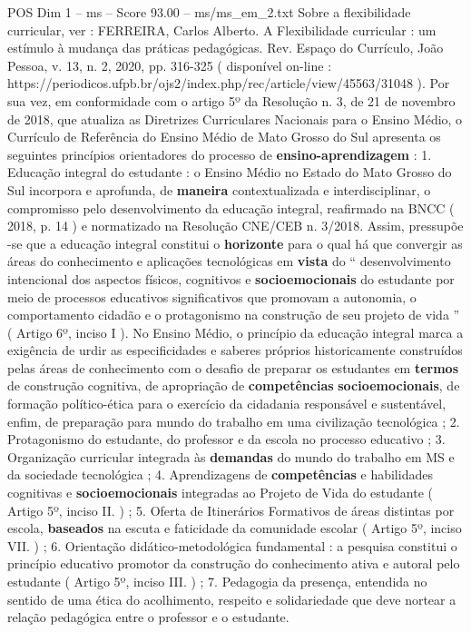 \begin{textsample}{POS Dim 1 – ms – Score 93.00 – ms/ms\_em\_2.txt}
Sobre a flexibilidade curricular, ver : FERREIRA, Carlos Alberto.
A Flexibilidade curricular : um estímulo à mudança das práticas pedagógicas.
Rev.
Espaço do Currículo, João Pessoa, v. 13, n. 2, 2020, pp. 316-325 ( disponível on-line : https://periodicos.ufpb.br/ojs2/index.php/rec/article/view/45563/31048 ).
Por sua vez, em conformidade com o artigo 5º da Resolução n. 3, de 21 de novembro de 2018, que atualiza as Diretrizes Curriculares Nacionais para o Ensino Médio, o Currículo de Referência do Ensino Médio de Mato Grosso do Sul apresenta os seguintes princípios orientadores do processo de \textbf{ensino-aprendizagem} : 1.
Educação integral do estudante : o Ensino Médio no Estado do Mato Grosso do Sul incorpora e aprofunda, de \textbf{maneira} contextualizada e interdisciplinar, o compromisso pelo desenvolvimento da educação integral, reafirmado na BNCC ( 2018, p. 14 ) e normatizado na Resolução CNE/CEB n. 3/2018.
Assim, pressupõe -se que a educação integral constitui o \textbf{horizonte} para o qual há que convergir as áreas do conhecimento e aplicações tecnológicas em \textbf{vista} do “ desenvolvimento intencional dos aspectos físicos, cognitivos e \textbf{socioemocionais} do estudante por meio de processos educativos significativos que promovam a autonomia, o comportamento cidadão e o protagonismo na construção de seu projeto de vida ” ( Artigo 6º, inciso I ).
No Ensino Médio, o princípio da educação integral marca a exigência de urdir as especificidades e saberes próprios historicamente construídos pelas áreas de conhecimento com o desafio de preparar os estudantes em \textbf{termos} de construção cognitiva, de apropriação de \textbf{competências} \textbf{socioemocionais}, de formação político-ética para o exercício da cidadania responsável e sustentável, enfim, de preparação para mundo do trabalho em uma civilização tecnológica ; 2.
Protagonismo do estudante, do professor e da escola no processo educativo ; 3.
Organização curricular integrada às \textbf{demandas} do mundo do trabalho em MS e da sociedade tecnológica ; 4.
Aprendizagens de \textbf{competências} e habilidades cognitivas e \textbf{socioemocionais} integradas ao Projeto de Vida do estudante ( Artigo 5º, inciso II. ) ; 5.
Oferta de Itinerários Formativos de áreas distintas por escola, \textbf{baseados} na escuta e faticidade da comunidade escolar ( Artigo 5º, inciso VII. ) ; 6.
Orientação didático-metodológica fundamental : a pesquisa constitui o princípio educativo promotor da construção do conhecimento ativa e autoral pelo estudante ( Artigo 5º, inciso III. ) ; 7.
Pedagogia da presença, entendida no sentido de uma ética do acolhimento, respeito e solidariedade que deve nortear a relação pedagógica entre o professor e o estudante.

\end{textsample}
